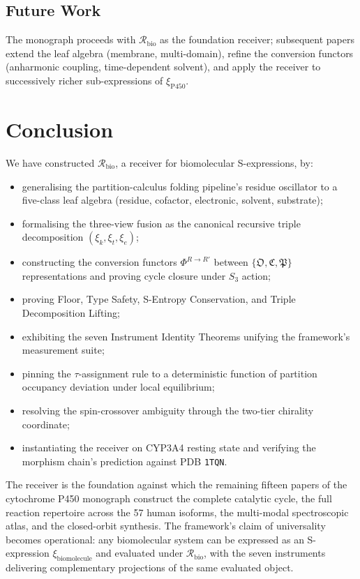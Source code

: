 \documentclass[11pt,twocolumn,a4paper]{article}
\theoremstyle{definition}
\theoremstyle{remark}
\newcommand{\Recv}{\mathcal{R}}
\newcommand{\Osc}{\mathfrak{O}}
\newcommand{\Cat}{\mathfrak{C}}
\newcommand{\Part}{\mathfrak{P}}
\newcommand{\Sexp}{\xi}
\begin{document}
\subsection{Future Work}

The monograph proceeds with $\Recv_{\mathrm{bio}}$ as the foundation receiver; subsequent papers extend the leaf algebra (membrane, multi-domain), refine the conversion functors (anharmonic coupling, time-dependent solvent), and apply the receiver to successively richer sub-expressions of $\Sexp_{\mathrm{P450}}$.

\section{Conclusion}
\label{sec:conclusion}

We have constructed $\Recv_{\mathrm{bio}}$, a receiver for biomolecular S-expressions, by:
\begin{itemize}[nosep]
    \item generalising the partition-calculus folding pipeline's residue oscillator to a five-class leaf algebra (residue, cofactor, electronic, solvent, substrate);
    \item formalising the three-view fusion as the canonical recursive triple decomposition $(\Sexp_k, \Sexp_t, \Sexp_e)$;
    \item constructing the conversion functors $\Phi^{R \to R'}$ between $\{\Osc, \Cat, \Part\}$ representations and proving cycle closure under $S_3$ action;
    \item proving Floor, Type Safety, S-Entropy Conservation, and Triple Decomposition Lifting;
    \item exhibiting the seven Instrument Identity Theorems unifying the framework's measurement suite;
    \item pinning the $\tau$-assignment rule to a deterministic function of partition occupancy deviation under local equilibrium;
    \item resolving the spin-crossover ambiguity through the two-tier chirality coordinate;
    \item instantiating the receiver on CYP3A4 resting state and verifying the morphism chain's prediction against PDB \texttt{1TQN}.
\end{itemize}

The receiver is the foundation against which the remaining fifteen papers of the cytochrome P450 monograph construct the complete catalytic cycle, the full reaction repertoire across the 57 human isoforms, the multi-modal spectroscopic atlas, and the closed-orbit synthesis. The framework's claim of universality becomes operational: any biomolecular system can be expressed as an S-expression $\Sexp_{\mathrm{biomolecule}}$ and evaluated under $\Recv_{\mathrm{bio}}$, with the seven instruments delivering complementary projections of the same evaluated object.
\end{document}
